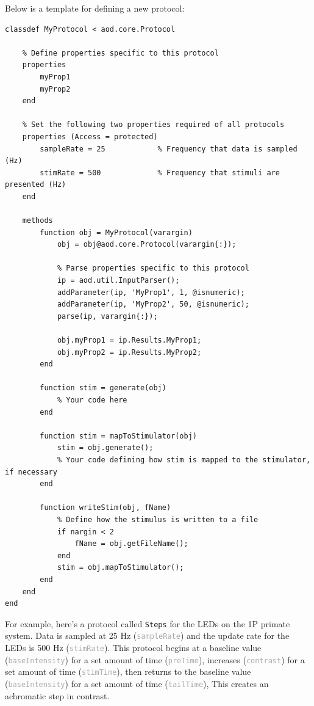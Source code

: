 \documentclass[10pt]{exam}
\newcommand\aodclass[1]{\textcolor{codeblue}{\texttt{#1}}}
\newcommand\aodprop[1]{\textcolor{darkgray}{\texttt{#1}}}
\begin{document}
		\noindent Below is a template for defining a new protocol:
		\begin{lstlisting}[style=Matlab-editor, basicstyle=\mlttfamily\footnotesize]
classdef MyProtocol < aod.core.Protocol

	% Define properties specific to this protocol
	properties
		myProp1
		myProp2
	end 
	
	% Set the following two properties required of all protocols
	properties (Access = protected)
		sampleRate = 25            % Frequency that data is sampled (Hz)  	
		stimRate = 500             % Frequency that stimuli are presented (Hz)         
	end
	
	methods
		function obj = MyProtocol(varargin)
			obj = obj@aod.core.Protocol(varargin{:});
			
			% Parse properties specific to this protocol
			ip = aod.util.InputParser();
			addParameter(ip, 'MyProp1', 1, @isnumeric);
			addParameter(ip, 'MyProp2', 50, @isnumeric);
			parse(ip, varargin{:});
		
			obj.myProp1 = ip.Results.MyProp1;
			obj.myProp2 = ip.Results.MyProp2;
		end
	
		function stim = generate(obj)
			% Your code here
		end
	
		function stim = mapToStimulator(obj)
			stim = obj.generate();
			% Your code defining how stim is mapped to the stimulator, if necessary
		end
	
		function writeStim(obj, fName)
			% Define how the stimulus is written to a file
			if nargin < 2
				fName = obj.getFileName();
			end
			stim = obj.mapToStimulator();
		end
	end
end
		\end{lstlisting}
		For example, here's a protocol called \aodclass{Steps} for the LEDs on the 1P primate system. Data is sampled at 25 Hz (\aodprop{sampleRate}) and the update rate for the LEDs is 500 Hz (\aodprop{stimRate}). 
		This protocol begins at a baseline value (\aodprop{baseIntensity}) for a set amount of time (\aodprop{preTime}), increases (\aodprop{contrast}) for a set amount of time (\aodprop{stimTime}), then returns to the baseline value (\aodprop{baseIntensity}) for a set amount of time (\aodprop{tailTime}), This creates an achromatic step in contrast.
\end{document}
